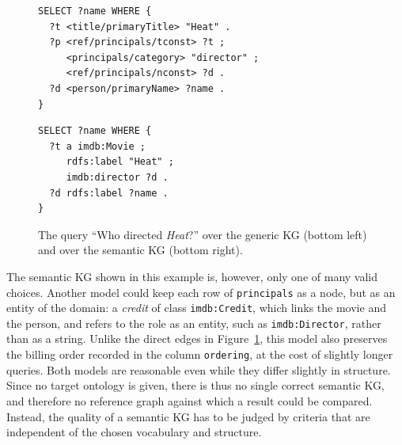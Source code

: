 \begin{figure}[!htbp]
  \begin{minipage}[t]{0.53\textwidth}
\begin{lstlisting}[language=SPARQL,basicstyle=\ttfamily\scriptsize, columns=fixed, xleftmargin=0pt]
SELECT ?name WHERE {
  ?t <title/primaryTitle> "Heat" .
  ?p <ref/principals/tconst> ?t ;
     <principals/category> "director" ;
     <ref/principals/nconst> ?d .
  ?d <person/primaryName> ?name .
}
\end{lstlisting}
  \end{minipage}
  \hfill
  \begin{minipage}[t]{0.41\textwidth}
\begin{lstlisting}[language=SPARQL, basicstyle=\ttfamily\scriptsize, columns=fixed, xleftmargin=0pt]
SELECT ?name WHERE {
  ?t a imdb:Movie ;
     rdfs:label "Heat" ;
     imdb:director ?d .
  ?d rdfs:label ?name .
}
\end{lstlisting}
  \end{minipage}
  \caption{The query ``Who directed \emph{Heat}?'' over the generic KG (bottom left) and over the semantic KG (bottom right).}
  \label{fig:generic-vs-semantic}
\end{figure}


The semantic KG shown in this example is, however, only one of many valid choices. Another model could keep each row of \texttt{principals} as a node, but as an entity of the domain: a \emph{credit} of class \texttt{imdb:Credit}, which links the movie and the person, and refers to the role as an entity, such as \texttt{imdb:Director}, rather than as a string. Unlike the direct edges in Figure~\ref{fig:generic-vs-semantic}, this model also preserves the billing order recorded in the column \texttt{ordering}, at the cost of slightly longer queries. Both models are reasonable even while they differ slightly in structure. Since no target ontology is given, there is thus no single correct semantic KG, and therefore no reference graph against which a result could be compared. Instead, the quality of a semantic KG has to be judged by criteria that are independent of the chosen vocabulary and structure.

